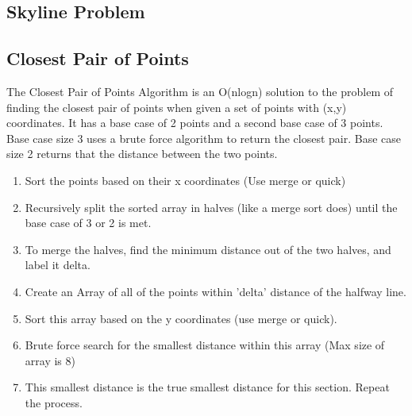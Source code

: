 
\subsection*{Skyline Problem}
\lipsum[1][1-2]
\subsection*{Closest Pair of Points}
The Closest Pair of Points Algorithm is an O(nlogn) solution to the problem of finding the closest pair of points
when given a set of points with (x,y) coordinates. It has a base case of 2 points and a second base case of 3 points.
Base case size 3 uses a brute force algorithm to return the closest pair. Base case size 2 returns that the distance between the two points.
\begin{enumerate}
    \item Sort the points based on their x coordinates (Use merge or quick)
    \item Recursively split the sorted array in halves (like a merge sort does) until the base case of 3 or 2 is met.
    \item To merge the halves, find the minimum distance out of the two halves, and label it delta. 
    \item Create an Array of all of the points within 'delta' distance of the halfway line.
    \item Sort this array based on the y coordinates (use merge or quick).
    \item Brute force search for the smallest distance within this array (Max size of array is 8) 
    \item This smallest distance is the true smallest distance for this section. Repeat the process.
\end{enumerate}

